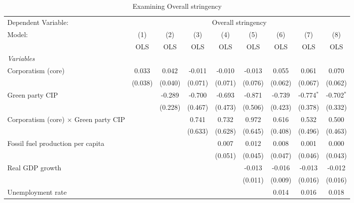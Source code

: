 
\begin{table}[htbp]
   \caption{Examining Overall stringency}
   \centering
   \begin{tabular}{lcccccccc}
      \toprule
      Dependent Variable: & \multicolumn{8}{c}{Overall stringency}\\
      Model:                                       & (1)     & (2)     & (3)     & (4)     & (5)     & (6)     & (7)          & (8)\\  
                                                   &  OLS    & OLS     & OLS     & OLS     & OLS     & OLS     & OLS          & OLS\\  
      \midrule
      \emph{Variables}\\
      Corporatism (core)                           & 0.033   & 0.042   & -0.011  & -0.010  & -0.013  & 0.055   & 0.061        & 0.070\\   
                                                   & (0.038) & (0.040) & (0.071) & (0.071) & (0.076) & (0.062) & (0.067)      & (0.062)\\   
      Green party CIP                              &         & -0.289  & -0.700  & -0.693  & -0.871  & -0.739  & -0.774$^{*}$ & -0.702$^{*}$\\   
                                                   &         & (0.228) & (0.467) & (0.473) & (0.506) & (0.423) & (0.378)      & (0.332)\\   
      Corporatism (core) $\times$ Green party CIP  &         &         & 0.741   & 0.732   & 0.972   & 0.616   & 0.532        & 0.500\\   
                                                   &         &         & (0.633) & (0.628) & (0.645) & (0.408) & (0.496)      & (0.463)\\   
      Fossil fuel production per capita            &         &         &         & 0.007   & 0.012   & 0.008   & 0.001        & 0.000\\   
                                                   &         &         &         & (0.051) & (0.045) & (0.047) & (0.046)      & (0.043)\\   
      Real GDP growth                              &         &         &         &         & -0.013  & -0.016  & -0.013       & -0.012\\   
                                                   &         &         &         &         & (0.011) & (0.009) & (0.016)      & (0.016)\\   
      Unemployment rate                            &         &         &         &         &         & 0.014   & 0.016        & 0.018\\   

\end{tabular}
\end{table}
